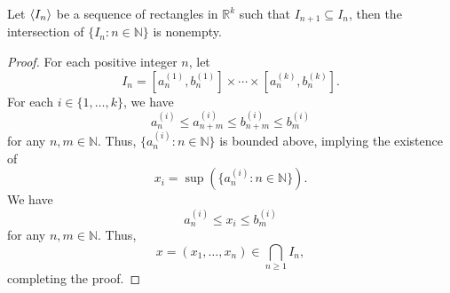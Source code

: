 \begin{theorem}
  Let $\left\langle I_n\right\rangle$ be a sequence of rectangles in $\mathbb{R}^k$ such that
  $I_{n+1} \subseteq I_n$, then the intersection of $\{I_n: n \in \mathbb{N}\}$
  is nonempty.
\end{theorem}
\begin{proof}
  For each positive integer $n$, let
  \begin{equation*}
    I_n = [a_n^{(1)}, b_n^{(1)}] \times \cdots \times
    [a_n^{(k)}, b_n^{(k)}].
  \end{equation*}
  For each $i \in \{1, \dots, k\}$, we have
  \begin{equation*}
    a_n^{(i)} \leq a_{n+m}^{(i)} \leq b_{n+m}^{(i)} \leq b_m^{(i)}
  \end{equation*}
  for any $n, m \in \mathbb{N}$.
  Thus, $\{a_n^{(i)}: n \in \mathbb{N}\}$ is bounded above, implying the
  existence of
  \begin{equation*}
    x_i = \sup(\{a_n^{(i)}: n \in \mathbb{N}\}).
  \end{equation*}
  We have
  \begin{equation*}
    a_n^{(i)} \leq x_i \leq b_m^{(i)}
  \end{equation*}
  for any $n, m \in \mathbb{N}$.
  Thus,
  \begin{equation*}
    x = (x_1, \dots, x_n) \in \bigcap_{n \geq 1} I_n,
  \end{equation*}
  completing the proof.
\end{proof}

